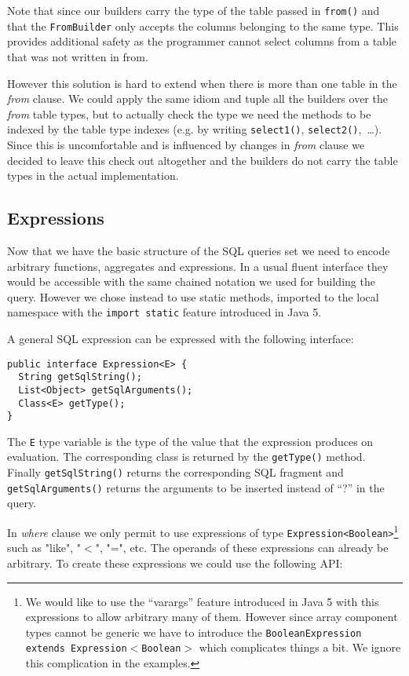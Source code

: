 \documentclass{sig-alternate}
\begin{document}
Note that since our builders carry the type of the table passed in \verb!from()! and that the \verb!FromBuilder! only accepts the columns belonging to the same type. This provides additional safety as the programmer cannot select columns from a table that was not written in from.

However this solution is hard to extend when there is more than one table in the \emph{from} clause. We could apply the same idiom and tuple all the builders over the \emph{from} table types, but to actually check the type we need the methods to be indexed by the table type indexes (e.g. by writing \verb!select1()!, \verb!select2()!,~\ldots). Since this is uncomfortable and is influenced by changes in \emph{from} clause we decided to leave this check out altogether and the builders do not carry the table types in the actual implementation.

\subsection{Expressions}

Now that we have the basic structure of the SQL queries set we need to encode arbitrary functions, aggregates and expressions. In a usual fluent interface they would be accessible with the same chained notation we used for building the query. However we chose instead to use static methods, imported to the local namespace with the \verb!import static! feature introduced in Java 5.

A general SQL expression can be expressed with the following interface:
\begin{verbatim}
public interface Expression<E> {
  String getSqlString();
  List<Object> getSqlArguments();
  Class<E> getType();		
}
\end{verbatim}

The \verb!E! type variable is the type of the value that the expression produces on evaluation. The corresponding class is returned by the \verb!getType()! method. Finally \verb!getSqlString()! returns the corresponding SQL fragment and \verb!getSqlArguments()! returns the arguments to be inserted instead of ``?'' in the query. 

In \emph{where} clause we only permit to use expressions of type \verb!Expression<Boolean>!\footnote{We would like to use the ``varargs'' feature introduced in Java 5 with this expressions to allow arbitrary many of them. However since array component types cannot be generic we have to introduce the \texttt{BooleanExpression extends Expression$<$Boolean$>$} which complicates things a bit. We ignore this complication in the examples.} such as "like", "$<$", "=", etc. The operands of these expressions can already be arbitrary. To create these expressions we could use the following API:
\end{document}

